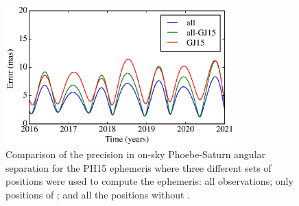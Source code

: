 \documentclass[useAMS,usenatbib]{mn2e}
\begin{document}
\begin{figure}
\begin{centering}
\includegraphics[width=8.8cm]{figures/PH15_err_angsep.eps}  
\caption{Comparison of the precision in on-sky Phoebe-Saturn angular separation for the PH15 ephemeris where three different sets of positions were used to compute the ephemeris: all observations; only positions of ; and all the positions without .}
\label{Fig:err-Phoebe}
\end{centering}
\end{figure}
\end{document}
